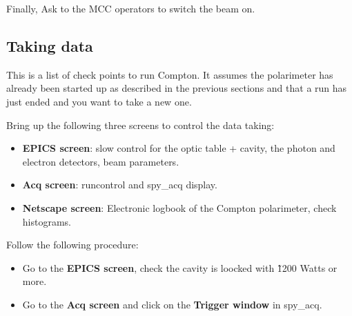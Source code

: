 {{\begin{itemize}
Finally, Ask to the MCC operators to switch the beam on.
\end{itemize}

\subsection{Taking data}
This is a list of check points to run Compton. It assumes the polarimeter 
has already been started up as described in the previous sections and  
that a run has just ended and you want to take a 
new one.

Bring up the  following three screens to control the data taking:

\begin{itemize}
\item {\bf EPICS screen}: slow control for the optic table + cavity, the 
photon and electron detectors, beam parameters.
\item {\bf Acq screen}: runcontrol and spy\_acq display.
\item {\bf Netscape screen}: Electronic logbook of the Compton polarimeter, 
check histograms.
 \end{itemize}

Follow the following procedure:
\begin{itemize}
\item Go to the {\bf EPICS screen}, check the cavity is loocked with \~1200 Watts 
or more.
\item Go to the {\bf Acq screen} and click on the {\bf Trigger window} in spy\_acq. 
   

\end{itemize}}}
